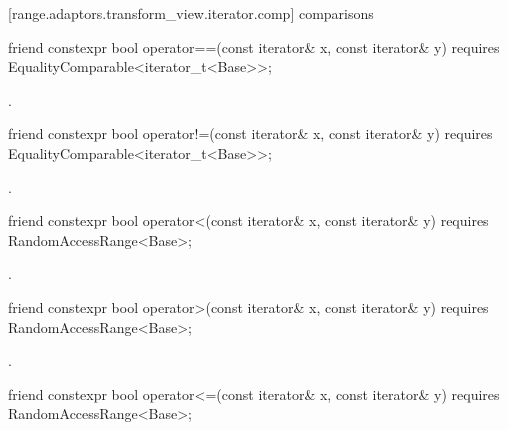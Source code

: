 [range.adaptors.transform_view.iterator.comp]{ comparisons}

\begin{itemdecl}
friend constexpr bool operator==(const iterator& x, const iterator& y)
  requires EqualityComparable<iterator_t<Base>>;
\end{itemdecl}

\begin{itemdescr}
\pnum
\returns {}.
\end{itemdescr}

%
\begin{itemdecl}
friend constexpr bool operator!=(const iterator& x, const iterator& y)
  requires EqualityComparable<iterator_t<Base>>;
\end{itemdecl}

\begin{itemdescr}
\pnum
\returns {}.
\end{itemdescr}

%
\begin{itemdecl}
friend constexpr bool operator<(const iterator& x, const iterator& y)
  requires RandomAccessRange<Base>;
\end{itemdecl}

\begin{itemdescr}
\pnum
\returns {}.
\end{itemdescr}

%
\begin{itemdecl}
friend constexpr bool operator>(const iterator& x, const iterator& y)
  requires RandomAccessRange<Base>;
\end{itemdecl}

\begin{itemdescr}
\pnum
\returns {}.
\end{itemdescr}

%
\begin{itemdecl}
friend constexpr bool operator<=(const iterator& x, const iterator& y)
  requires RandomAccessRange<Base>;
\end{itemdecl}

